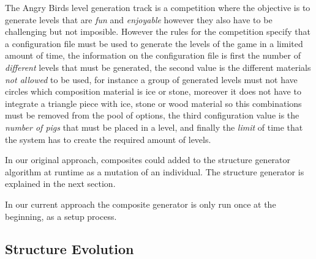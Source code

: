 \documentclass[conference]{IEEEtran}
\begin{document}
    The Angry Birds level generation track is a competition where the objective is 
    to generate levels that are \textit{fun} and \textit{enjoyable} however they 
    also have to be challenging but not imposible. However the rules for the competition 
    specify that a configuration file must be used to
    generate the levels of the game in a limited amount of time, the information on
    the configuration file is first the number of \textit{different} levels
    that must be generated, the second value is the different materials \textit{not
    allowed} to be used, for instance a group of generated levels must not have
    circles which composition material is ice or stone, moreover it does not have to
    integrate a triangle piece with ice, stone or wood material so this combinations
    must be removed from the pool of options, the third configuration value is the
    \textit{number of pigs} that must be placed in a level, and finally the
    \textit{limit} of time that the system has to create the required amount of
    levels.
    
    
    In our original approach, composites could added to the structure generator
    algorithm at runtime as a mutation of an individual. The structure generator
    is explained in the next section.

    
    In our current approach the composite generator is only
    run once at the beginning, as a setup process.
    

    \subsection{Structure Evolution}
\end{document}

